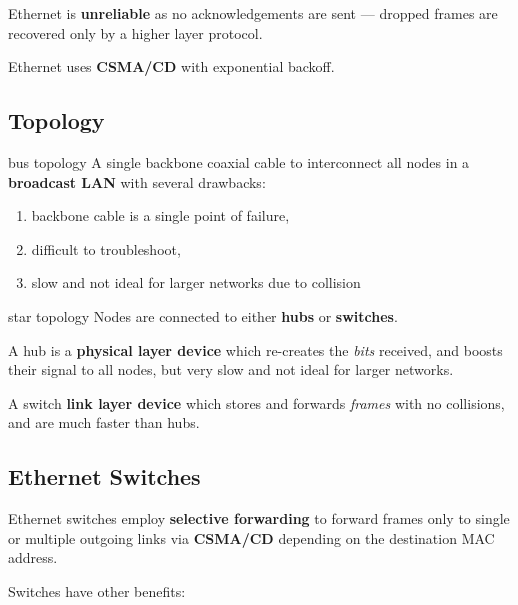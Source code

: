Ethernet is \textbf{unreliable} as no acknowledgements are sent --- dropped frames are recovered
only by a higher layer protocol.

Ethernet uses \textbf{CSMA/CD} with exponential backoff.

\subsection{Topology}

\begin{defn}{bus topology}
    A single backbone coaxial cable to interconnect all nodes
    in a \textbf{broadcast LAN} with several drawbacks:

    \begin{enumerate}
        \item backbone cable is a single point of failure,
        \item difficult to troubleshoot,
        \item slow and not ideal for larger networks due to collision
    \end{enumerate}
\end{defn}

\begin{defn}{star topology}
    Nodes are connected to either \textbf{hubs} or \textbf{switches}.
    
    A hub is a \textbf{physical layer device} which re-creates the \textit{bits} received,
    and boosts their signal to all nodes, but very slow and not ideal for larger networks.

    A switch \textbf{link layer device} which stores and forwards \textit{frames} with no collisions,
    and are much faster than hubs.
\end{defn}

\subsection{Ethernet Switches}
Ethernet switches employ \textbf{selective forwarding} to forward frames only to single or multiple
outgoing links via \textbf{CSMA/CD} depending on the destination MAC address.

Switches have other benefits:
\begin{itemize*}
\end{itemize*}

